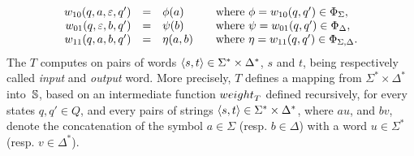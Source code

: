 \[
\begin{array}{rcll}
\wei_{10}(q, a, \varepsilon, q') & = & \phi(a) & %
\quad\mathrm{where~} \phi = \wei_{10}(q, q') \in \Phi_\Sigma,\\
\wei_{01}(q, \varepsilon, b, q') & = & \psi(b) &
\quad\mathrm{where~} \psi = \wei_{01}(q, q') \in \Phi_\Delta,\\
\wei_{11}(q, a, b, q') & = & \eta(a, b) &
\quad\mathrm{where~} \eta = \wei_{11}(q, q') \in \Phi_{\Sigma, \Delta}.\\
\end{array}
\]
%
\noindent
The \SWT $T$ computes on pairs of words $\< s, t> \in \Sigma^* \times \Delta^*$,
$s$ and $t$, being respectively called \emph{input} and \emph{output} word.
More precisely, $T$ defines a mapping
from $\Sigma^* \times \Delta^*$ into~$\mathbb{S}$,
based on an intermediate function $\weight_T$
defined recursively, for every states $q, q' \in Q$,
and every pairs of strings $\< s, t> \in \Sigma^* \times \Delta^*$,
where $au$, and $bv$, denote the concatenation
of the symbol $a \in \Sigma$ (resp. $b \in \Delta$)
with a word $u \in \Sigma^*$ (resp. $v \in \Delta^*$).
%
%

